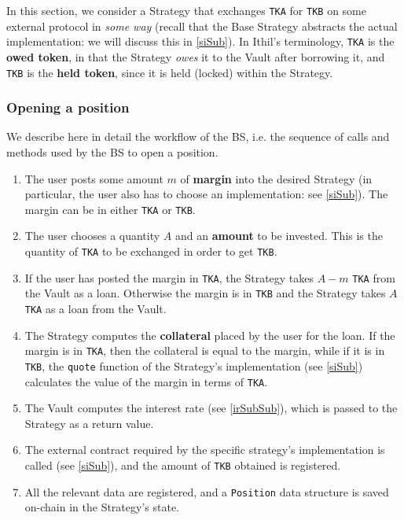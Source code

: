 \documentclass[a4paper,10 pt]{article}
\theoremstyle{definition}
\begin{document}
 In this section, we consider a Strategy that exchanges \verb|TKA| for \verb|TKB| on some external protocol in {\it some way} (recall that the Base Strategy abstracts the actual implementation: we will discuss this in \ref{siSub}). In Ithil's terminology, \verb|TKA| is the {\bf owed token}, in that the Strategy {\it owes} it to the Vault after borrowing it, and \verb|TKB| is the {\bf held token}, since it is held (locked) within the Strategy.

\subsubsection{Opening a position}\label{opSubSub}
We describe here in detail the workflow of the BS, i.e. the sequence of calls and methods used by the BS to open a position.

\begin{enumerate}
\item The user posts some amount $m$ of {\bf margin} into the desired Strategy (in particular, the user also has to choose an implementation: see \ref{siSub}). The margin can be in either \verb|TKA| or \verb|TKB|.
\item The user chooses a quantity $A$ and an {\bf amount} to be invested. This is the quantity of \verb|TKA| to be exchanged in order to get \verb|TKB|.
\item If the user has posted the margin in \verb|TKA|, the Strategy takes $A-m$ \verb|TKA| from the Vault as a loan. Otherwise the margin is in \verb|TKB| and the Strategy takes $A$ \verb|TKA| as a loan from the Vault.
\item The Strategy computes the {\bf collateral} placed by the user for the loan. If the margin is in \verb|TKA|, then the collateral is equal to the margin, while if it is in \verb|TKB|, the \verb|quote| function of the Strategy's implementation (see \ref{siSub}) calculates the value of the margin in terms of \verb|TKA|.
\item The Vault computes the interest rate (see \ref{irSubSub}), which is passed to the Strategy as a return value.
\item The external contract required by the specific strategy's implementation is called (see \ref{siSub}), and the amount of \verb|TKB| obtained is registered.
\item All the relevant data are registered, and a \verb|Position| data structure is saved on-chain in the Strategy's state.
\end{enumerate}
\end{document}
